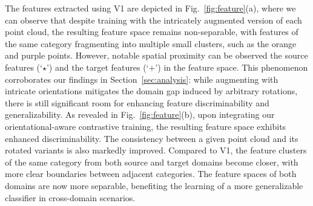 The features extracted using V1 are depicted in Fig.~\ref{fig:feature}(a), where we can observe that despite training with the intricately augmented version of each point cloud, the resulting feature space remains non-separable, with features of the same category fragmenting into multiple small clusters, such as the orange and purple points. However, notable spatial proximity can be observed \wrt the source features (`$\star$') and the target features (`$+$') in the feature space. This phenomenon corroborates our findings in Section~\ref{sec:analysis}: while augmenting with intricate orientations mitigates the domain gap induced by arbitrary rotations, there is still significant room for enhancing feature discriminability and generalizability. 
As revealed in Fig.~\ref{fig:feature}(b), upon integrating our orientational-aware contrastive training, the resulting feature space exhibits enhanced discriminability. The consistency between a given point cloud and its rotated variants is also markedly improved. Compared to V1, the feature clusters of the same category from both source and target domains become closer, with more clear boundaries between adjacent categories. The feature spaces of both domains are now more separable, benefiting the learning of a more generalizable classifier in cross-domain scenarios. 


